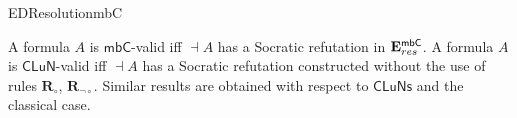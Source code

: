 \begin{entry}{EDResolutionmbC}
\begin{technicalities}
A formula $A$ is $\mathsf{mbC}$-valid iff $\dashv A$ has a Socratic refutation in $\mathbf{E}^\mathsf{mbC}_{res}$. A formula $A$ is $\mathsf{CLuN}$-valid iff $\dashv A$ has a Socratic refutation constructed without the use of rules $\mathbf{R}_\circ$, $\mathbf{R}_{\lnot \circ}$. Similar results are obtained with respect to $\mathsf{CLuNs}$ and the classical case.
\end{technicalities}













\end{entry}
